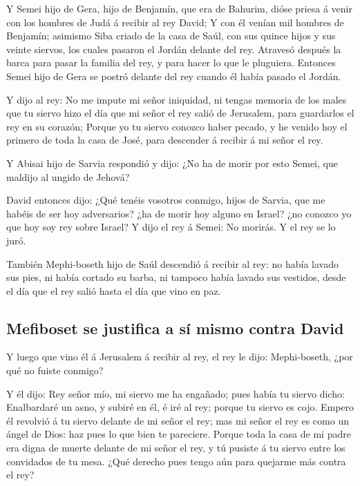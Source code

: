  Y Semei hijo de Gera, hijo de Benjamín, que era de
Bahurim, dióse priesa á venir con los hombres de Judá á recibir al rey
David;  Y con él venían mil hombres de Benjamín; asimismo
Siba criado de la casa de Saúl, con sus quince hijos y sus veinte
siervos, los cuales pasaron el Jordán delante del rey. 
Atravesó después la barca para pasar la familia del rey, y para hacer lo
que le pluguiera. Entonces Semei hijo de Gera se postró delante del rey
cuando él había pasado el Jordán.

 Y dijo al rey: No me impute mi señor iniquidad, ni
tengas memoria de los males que tu siervo hizo el día que mi señor el
rey salió de Jerusalem, para guardarlos el rey en su corazón;
 Porque yo tu siervo conozco haber pecado, y he venido
hoy el primero de toda la casa de José, para descender á recibir á mi
señor el rey.

 Y Abisai hijo de Sarvia respondió y dijo: ¿No ha de
morir por esto Semei, que maldijo al ungido de Jehová?

 David entonces dijo: ¿Qué tenéis vosotros conmigo, hijos
de Sarvia, que me habéis de ser hoy adversarios? ¿ha de morir hoy alguno
en Israel? ¿no conozco yo que hoy soy rey sobre Israel? 
Y dijo el rey á Semei: No morirás. Y el rey se lo juró.

 También Mephi-boseth hijo de Saúl descendió á recibir al
rey: no había lavado sus pies, ni había cortado su barba, ni tampoco
había lavado sus vestidos, desde el día que el rey salió hasta el día
que vino en paz.

\hypertarget{mefiboset-se-justifica-a-suxed-mismo-contra-david}{%
\subsection{Mefiboset se justifica a sí mismo contra
David}\label{mefiboset-se-justifica-a-suxed-mismo-contra-david}}

 Y luego que vino él á Jerusalem á recibir al rey, el rey
le dijo: Mephi-boseth, ¿por qué no fuiste conmigo?

 Y él dijo: Rey señor mío, mi siervo me ha engañado; pues
había tu siervo dicho: Enalbardaré un asno, y subiré en él, é iré al
rey; porque tu siervo es cojo.  Empero él revolvió á tu
siervo delante de mi señor el rey; mas mi señor el rey es como un ángel
de Dios: haz pues lo que bien te pareciere.  Porque toda
la casa de mi padre era digna de muerte delante de mi señor el rey, y tú
pusiste á tu siervo entre los convidados de tu mesa. ¿Qué derecho pues
tengo aún para quejarme más contra el rey?


